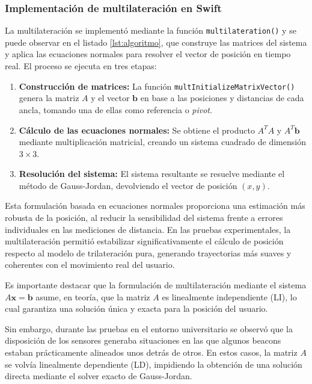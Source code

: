 \subsubsection*{Implementación de multilateración en Swift}

La multilateración se implementó mediante la función \texttt{multilateration()} y se puede observar en el listado \ref{lst:algoritmo}, que construye las matrices del sistema y aplica las ecuaciones normales para resolver el vector de posición en tiempo real. El proceso se ejecuta en tres etapas:

\begin{enumerate}
    \item \textbf{Construcción de matrices:} La función \texttt{multInitializeMatrixVector()} genera la matriz $A$ y el vector $\mathbf{b}$ en base a las posiciones y distancias de cada ancla, tomando una de ellas como referencia o \textit{pivot}.
    \item \textbf{Cálculo de las ecuaciones normales:} Se obtiene el producto $A^TA$ y $A^T\mathbf{b}$ mediante multiplicación matricial, creando un sistema cuadrado de dimensión $3 \times 3$.
    \item \textbf{Resolución del sistema:} El sistema resultante se resuelve mediante el método de Gauss-Jordan, devolviendo el vector de posición $(x, y)$.
\end{enumerate}

Esta formulación basada en ecuaciones normales proporciona una estimación más robusta de la posición, al reducir la sensibilidad del sistema frente a errores individuales en las mediciones de distancia. En las pruebas experimentales, la multilateración permitió estabilizar significativamente el cálculo de posición respecto al modelo de trilateración pura, generando trayectorias más suaves y coherentes con el movimiento real del usuario.

Es importante destacar que la formulación de multilateración mediante el sistema $A \mathbf{x} = \mathbf{b}$ asume, en teoría, que la matriz $A$ es linealmente independiente (LI), lo cual garantiza una solución única y exacta para la posición del usuario. %

Sin embargo, durante las pruebas en el entorno universitario se observó que la disposición de los sensores generaba situaciones en las que algunos beacons estaban prácticamente alineados unos detrás de otros. En estos casos, la matriz $A$ se volvía linealmente dependiente (LD), impidiendo la obtención de una solución directa mediante el solver exacto de Gauss-Jordan. %

